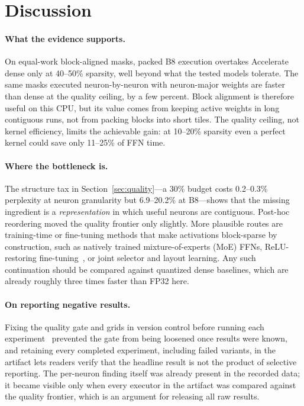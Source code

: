 \section{Discussion}

\paragraph{What the evidence supports.} On equal-work block-aligned masks,
packed B8 execution overtakes Accelerate dense only at 40--50\% sparsity,
well beyond what the tested models tolerate. The same masks executed
neuron-by-neuron with neuron-major weights are faster than dense at the
quality ceiling, by a few percent. Block alignment is therefore useful on this
CPU, but its value comes from keeping active weights in long contiguous runs,
not from packing blocks into short tiles. The quality ceiling, not kernel
efficiency, limits the achievable gain: at 10--20\% sparsity even a perfect
kernel could save only 11--25\% of FFN time.

\paragraph{Where the bottleneck is.} The structure tax in
Section~\ref{sec:quality}---a 30\% budget costs 0.2--0.3\% perplexity at
neuron granularity but 6.9--20.2\% at B8---shows that the missing ingredient is
a \emph{representation} in which useful neurons are contiguous. Post-hoc
reordering moved the quality frontier only slightly. More plausible routes are
training-time or fine-tuning methods that make activations block-sparse by
construction, such as natively trained mixture-of-experts (MoE) FFNs,
ReLU-restoring fine-tuning~\cite{relustrikes}, or joint selector and layout
learning. Any such continuation should be compared against quantized dense
baselines, which are already roughly three times faster than FP32 here.

\paragraph{On reporting negative results.} Fixing the quality gate and grids
in version control before running each experiment~\cite{prereg} prevented
the gate from being loosened once results were known, and retaining every
completed experiment, including failed variants, in the artifact lets readers
verify that the headline result is not the product of selective reporting.
The per-neuron finding itself was already present in the recorded data; it
became visible only when every executor in the artifact was compared against
the quality frontier, which is an argument for releasing all raw results.

